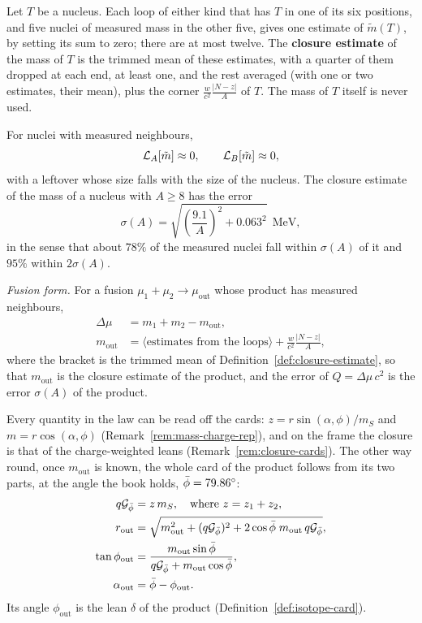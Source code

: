 \begin{definition}\label{def:closure-estimate}
Let $T$ be a nucleus. Each loop of either kind that has $T$ in one of its six positions, and five nuclei of measured mass in the other five, gives one estimate of $\tilde{m}(T)$, by setting its sum to zero; there are at most twelve. The \textbf{closure estimate} of the mass of $T$ is the trimmed mean of these estimates, with a quarter of them dropped at each end, at least one, and the rest averaged (with one or two estimates, their mean), plus the corner $\frac{w}{c^2}\frac{|N - z|}{A}$ of $T$. The mass of $T$ itself is never used.
\end{definition}

\begin{law}\label{law:closure}
For nuclei with measured neighbours,
\[
\mathcal{L}_A[\tilde{m}] \approx 0, \qquad \mathcal{L}_B[\tilde{m}] \approx 0,
\]
with a leftover whose size falls with the size of the nucleus. The closure estimate of the mass of a nucleus with $A \ge 8$ has the error
\[
\sigma(A) = \sqrt{\left(\frac{9.1}{A}\right)^2 + 0.063^2}\ \ \text{MeV},
\]
in the sense that about $78\%$ of the measured nuclei fall within $\sigma(A)$ of it and $95\%$ within $2\sigma(A)$.

\emph{Fusion form.} For a fusion $\mu_1 + \mu_2 \to \mu_{\text{out}}$ whose product has measured neighbours,
\begin{align*}
\Delta\mu &= m_1 + m_2 - m_{\text{out}},\\
m_{\text{out}} &= \big\langle \text{estimates from the loops} \big\rangle + \frac{w}{c^2}\frac{|N - z|}{A},
\end{align*}
where the bracket is the trimmed mean of Definition~\ref{def:closure-estimate}, so that $m_{\text{out}}$ is the closure estimate of the product, and the error of $Q = \Delta\mu\,c^2$ is the error $\sigma(A)$ of the product.
\end{law}

Every quantity in the law can be read off the cards: $z = r\sin(\alpha, \phi)/m_S$ and $m = r\cos(\alpha, \phi)$ (Remark~\ref{rem:mass-charge-rep}), and on the frame the closure is that of the charge-weighted leans (Remark~\ref{rem:closure-cards}). The other way round, once $m_{\text{out}}$ is known, the whole card of the product follows from its two parts, at the angle the book holds, $\bar{\phi} = 79.86^\circ$:
\begin{align*}
q\mathcal{G}_{\bar{\phi}} &= z\,m_S, \quad\text{where } z = z_1 + z_2,\\
r_{\text{out}} &= \sqrt{m_{\text{out}}^2 + (q\mathcal{G}_{\bar{\phi}})^2 + 2\cos\bar{\phi}\; m_{\text{out}}\, q\mathcal{G}_{\bar{\phi}}},\\
\tan\phi_{\text{out}} &= \frac{m_{\text{out}}\sin\bar{\phi}}{q\mathcal{G}_{\bar{\phi}} + m_{\text{out}}\cos\bar{\phi}},\\
\alpha_{\text{out}} &= \bar{\phi} - \phi_{\text{out}} .
\end{align*}
Its angle $\phi_{\text{out}}$ is the lean $\delta$ of the product (Definition~\ref{def:isotope-card}).

